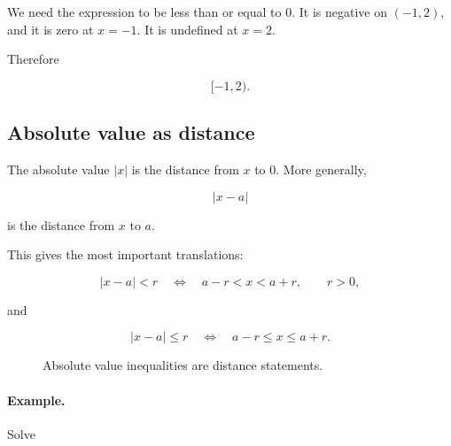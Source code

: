We need the expression to be less than or equal to \(0\).  It is negative on
\((-1,2)\), and it is zero at \(x=-1\).  It is undefined at \(x=2\).

Therefore

\[
\boxed{
[-1,2).
}
\]

\subsection{Absolute value as distance}
\label{appsubsec:absolute-value-distance-review}

The absolute value \(|x|\) is the distance from \(x\) to \(0\).  More generally,

\[
\boxed{
|x-a|
}
\]

is the distance from \(x\) to \(a\).

This gives the most important translations:

\[
\boxed{
|x-a|<r
\quad\Longleftrightarrow\quad
a-r<x<a+r,
}
\qquad r>0,
\]

and

\[
\boxed{
|x-a|\le r
\quad\Longleftrightarrow\quad
a-r\le x\le a+r.
}
\]

\begin{figure}[h]
\centering
{}
\caption{Absolute value inequalities are distance statements.}
\label{fig:absolute-value-distance-appendix}
\end{figure}

\paragraph{Example.}
Solve

